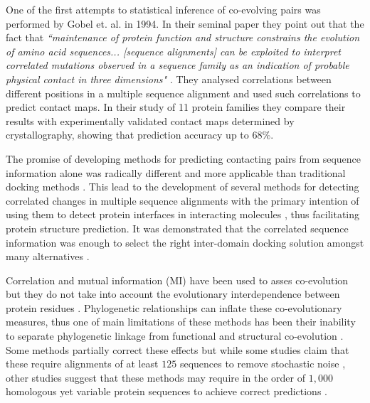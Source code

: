 One of the first attempts to statistical inference of co-evolving pairs was performed by Gobel et. al. in 1994.
In their seminal paper they point out that the fact that \textit{``maintenance of protein function and structure constrains the evolution of amino acid sequences... [sequence alignments] can be exploited to interpret correlated mutations observed in a sequence family as an indication of probable physical contact in three dimensions"} \cite{gobel1994correlated}. 
They  analysed correlations between different positions in a multiple sequence alignment and used such correlations to predict contact maps.
In their study of 11 protein families they compare their results with experimentally validated contact maps determined by crystallography, showing that prediction accuracy up to $68\%$.

The promise of developing methods for predicting contacting pairs from sequence information alone was radically different and more applicable than traditional docking methods \cite{pazos1997correlated}.
This lead to the development of several methods for detecting correlated changes in multiple sequence alignments with the primary intention of using them to detect protein interfaces in interacting molecules \cite{pazos1997correlated}, thus facilitating protein structure prediction.
It was demonstrated that the correlated sequence information was enough to select the right inter-domain docking solution amongst many alternatives  \cite{pazos1997correlated}.

Correlation and mutual information (MI) have been used to asses co-evolution but they do not take into account the evolutionary interdependence between protein residues \cite{fares2006novel}.
Phylogenetic relationships can inflate these co-evolutionary measures, thus one of main limitations of these methods has been their inability to separate phylogenetic linkage from functional and structural co-evolution \cite{fares2006novel}.
Some methods partially correct these effects but while some studies claim that these require alignments of at least $125$ sequences to remove stochastic noise \cite{gloor2005mutual}, other studies suggest that these methods may require in the order of $1,000$ homologous yet variable protein sequences to achieve correct predictions \cite{morcos2011direct}.

